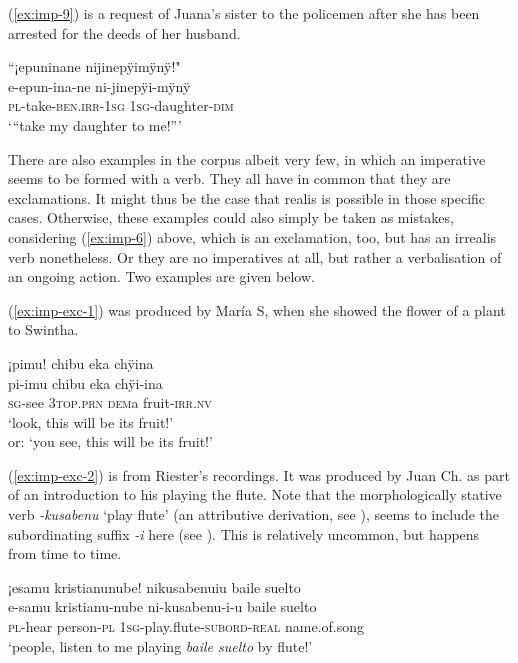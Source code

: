 (\ref{ex:imp-9}) is a request of Juana’s sister to the policemen after she has been arrested for the deeds of her husband.

\ea\label{ex:imp-9}
\begingl
\glpreamble “¡epuninane nijinepÿimÿnÿ!"\\
\gla e-epun-ina-ne ni-jinepÿi-mÿnÿ\\
\textsc{pl}-take-\textsc{ben.irr}-1\textsc{sg} 1\textsc{sg}-daughter-\textsc{dim}\\
\glft ‘“take my daughter to me!”’
\endgl
\trailingcitation{[jxx-p120430l-2.101]}
\xe

There are also examples in the corpus albeit very few, in which an imperative seems to be formed with a  verb. They all have in common that they are exclamations. It might thus be the case that realis is possible in those specific cases. Otherwise, these examples could also simply be taken as mistakes, considering (\ref{ex:imp-6}) above, which is an exclamation, too, but has an irrealis verb nonetheless. Or they are no imperatives at all, but rather a verbalisation of an ongoing action. Two examples are given below.

(\ref{ex:imp-exc-1}) was produced by María S, when she showed the flower of a plant to Swintha.

\ea\label{ex:imp-exc-1}
\begingl
\glpreamble ¡pimu! chibu eka chÿina\\
\gla pi-imu chibu eka chÿi-ina\\
\textsc{sg}-see 3\textsc{top.prn} \textsc{dem}a fruit-\textsc{irr.nv}\\
\glft ‘look, this will be its fruit!’\\or: ‘you see, this will be its fruit!’
\endgl
\trailingcitation{[rxx-e121126s-3.17-18]}
\xe

(\ref{ex:imp-exc-2}) is from Riester’s recordings. It was produced by Juan Ch. as part of an introduction to his playing the flute. Note that the morphologically stative verb \textit{-kusabenu} ‘play flute’ (an attributive derivation, see ), seems to include the subordinating suffix \textit{-i} here (see ). This is relatively uncommon, but happens from time to time.

\ea\label{ex:imp-exc-2}
\begingl
\glpreamble ¡esamu kristianunube! nikusabenuiu baile suelto\\
\gla e-samu kristianu-nube ni-kusabenu-i-u {baile suelto}\\
\textsc{pl}-hear person-\textsc{pl} 1\textsc{sg}-play.flute-\textsc{subord}-\textsc{real} {name.of.song}\\
\glft ‘people, listen to me playing \textit{baile suelto} by flute!’
\endgl
\trailingcitation{[nxx-a630101g-2.002-003]}
\xe

